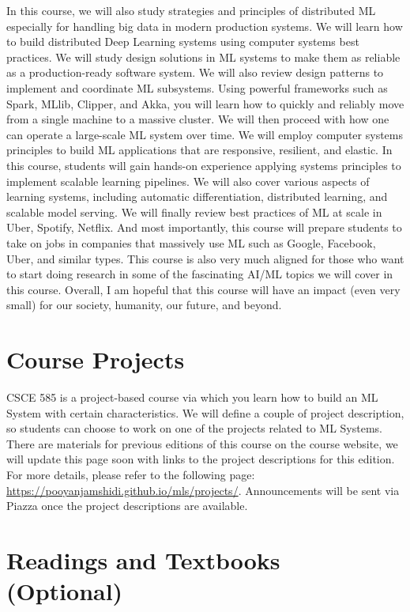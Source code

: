 \documentclass[11pt]{article}
\begin{document}
In this course, we will also study strategies and principles of distributed ML especially for handling big data in modern production systems. We will learn how to build distributed Deep Learning systems using computer systems best practices. We will study design solutions in ML systems to make them as reliable as a production-ready software system. We will also review design patterns to implement and coordinate ML subsystems. Using powerful frameworks such as Spark, MLlib, Clipper, and Akka, you will learn how to quickly and reliably move from a single machine to a massive cluster. We will then proceed with how one can operate a large-scale ML system over time. We will employ computer systems principles to build ML applications that are responsive, resilient, and elastic. In this course, students will gain hands-on experience applying systems principles to implement scalable learning pipelines. We will also cover various aspects of learning systems, including automatic differentiation, distributed learning, and scalable model serving. We will finally review best practices of ML at scale in Uber, Spotify, Netflix. And most importantly, this course will prepare students to take on jobs in companies that massively use ML such as Google, Facebook, Uber, and similar types. This course is also very much aligned for those who want to start doing research in some of the fascinating AI/ML topics we will cover in this course. Overall, I am hopeful that this course will have an impact (even very small) for our society, humanity, our future, and beyond.


\section*{Course Projects}

CSCE 585 is a project-based course via which you learn how to build an ML System with certain characteristics. We will define a couple of project description, so students can choose to work on one of the projects related to ML Systems.
There are materials for previous editions of this course on the course website, we will update this page soon with links to the project descriptions for this edition. For more details, please refer to the following page: \url{https://pooyanjamshidi.github.io/mls/projects/}. Announcements will be sent via Piazza once the project descriptions are available.


\section*{Readings and Textbooks (Optional)}
\end{document}
